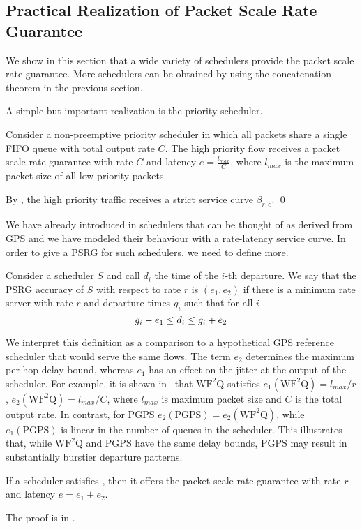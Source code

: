 \subsection{Practical Realization of Packet Scale Rate Guarantee}

We show in this section that a wide variety of schedulers
provide the packet scale rate guarantee. More schedulers can
be obtained by using the concatenation theorem in the previous
section.

A simple but important realization is the priority scheduler.
\begin{proposition}
Consider a non-preemptive priority scheduler in which all
packets share a single FIFO queue with total output rate $C$.
The high priority flow receives a packet scale rate guarantee
with rate $C$ and latency $e= \frac{l_{max}}{C}$, where
$l_{max}$ is the maximum packet size of all low priority
packets.
\end{proposition}
\pr
By , the high priority traffic receives a
strict service curve $\beta_{r,c}$. \qed

We have already introduced in  schedulers that
can be thought of as derived from GPS and we have modeled
their behaviour with a rate-latency service curve. In order to
give a PSRG for such schedulers, we need to define more.

\newcommand{\wf} {\textrm{WF}^2\textrm{Q}}
\begin{definition}
Consider a scheduler $S$ and call $d_i$ the time of the $i$-th
departure. We say that the PSRG accuracy of $S$ with respect
to rate $r$ is $(e_1, e_2)$ if there is a minimum rate server
with rate $r$ and departure times $g_i$ such that for all $i$
\begin{equation}\mylabel{eq-asc-eq6}
  g_i-e_1 \leq d_i\leq g_i + e_2
\end{equation}
\end{definition}
We interpret this definition as a comparison to a hypothetical
GPS reference scheduler that would serve the same flows. The
term $e_2$ determines the maximum  per-hop delay bound,
whereas $e_1$ has an effect on the jitter at the output of the
scheduler. For example, it is shown in\ \cite{BZ96a} that
$\wf$ satisfies $e_1(\wf) = l_{max}/r$, $e_2(\wf) =
l_{max}/C$, where $l_{max}$ is maximum packet size and $C$ is
the total output rate. In contrast, for PGPS \cite{pg94}
$e_2(\textrm{PGPS}) = e_2(\wf)$, while $e_1(\textrm{PGPS})$ is
linear in the number of queues in the scheduler. This
illustrates that, while $\wf$ and PGPS have the same delay
bounds, PGPS may result in substantially burstier departure
patterns.
\begin{theorem}
\label{theo-ascgps} If a scheduler satisfies
, then it offers the packet scale rate
guarantee with rate $r$ and latency $e= e_1 + e_2$.
\end{theorem}
The proof is in .

